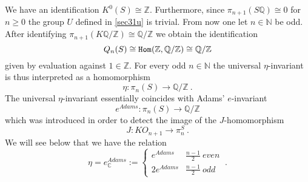 \documentclass[12pt]{article}
\newcommand{\nat}{{\mathbb{N}}}
\newcommand{\Z}{{\mathbb{Z}}}
\newcommand{\Q}{{\mathbb{Q}}}
\newcommand{\C}{{\mathbb{C}}}
\newcommand{\Hom}{{\tt Hom}}
\begin{document}
We have an identification
$K^{0}(S)\cong \Z$.
Furthermore, since $\pi_{n+1}(S\Q)\cong 0$ for $n\ge 0$   the group $U$ defined in \eqref{sec31u} is trivial. From now one let $n\in \nat$ be odd. After identifying 
$\pi_{n+1}(K\Q/\Z)\cong \Q/\Z$   we obtain  the identification
$$Q_{n}(S)\cong \Hom(\Z,\Q/\Z)\cong \Q/\Z$$ given by evaluation against $1\in \Z$.
For every odd $n\in \nat$ the universal $\eta$-invariant is thus interpreted as a homomorphism
\begin{equation}\label{eq1200} \eta:\pi_{n}(S)\to \Q/\Z\ .\end{equation}
The universal $\eta$-invariant essentially coincides with Adams' $e$-invariant  \cite{MR0198470}
$$e^{Adams}:\pi_{n}(S)\to \Q/\Z$$ which was introduced in order to detect  
the image of the $J$-homomorphism
\begin{equation}\label{eq30001}J:KO_{n+1}\to \pi^{S}_{n}\ .\end{equation} 
We will see below that we have the  relation
\begin{equation}\label{gleichheit}\eta=e^{Adams}_{\C}:=\left\{\begin{array}{cc}e^{Adams}&\frac{n-1}{2} \:even\\
2e^{Adams}&\frac{n-1}{2}\: odd\end{array}\right. \ . \end{equation}
\end{document}
